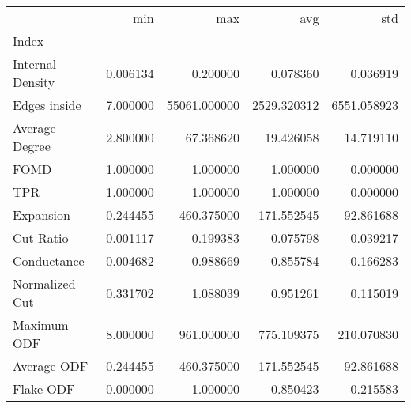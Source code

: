 \begin{tabular}{lrrrr}
\toprule
{} &       min &           max &          avg &          std \\
Index            &           &               &              &              \\
\midrule
Internal Density &  0.006134 &      0.200000 &     0.078360 &     0.036919 \\
Edges inside     &  7.000000 &  55061.000000 &  2529.320312 &  6551.058923 \\
Average Degree   &  2.800000 &     67.368620 &    19.426058 &    14.719110 \\
FOMD             &  1.000000 &      1.000000 &     1.000000 &     0.000000 \\
TPR              &  1.000000 &      1.000000 &     1.000000 &     0.000000 \\
Expansion        &  0.244455 &    460.375000 &   171.552545 &    92.861688 \\
Cut Ratio        &  0.001117 &      0.199383 &     0.075798 &     0.039217 \\
Conductance      &  0.004682 &      0.988669 &     0.855784 &     0.166283 \\
Normalized Cut   &  0.331702 &      1.088039 &     0.951261 &     0.115019 \\
Maximum-ODF      &  8.000000 &    961.000000 &   775.109375 &   210.070830 \\
Average-ODF      &  0.244455 &    460.375000 &   171.552545 &    92.861688 \\
Flake-ODF        &  0.000000 &      1.000000 &     0.850423 &     0.215583 \\
\bottomrule
\end{tabular}
